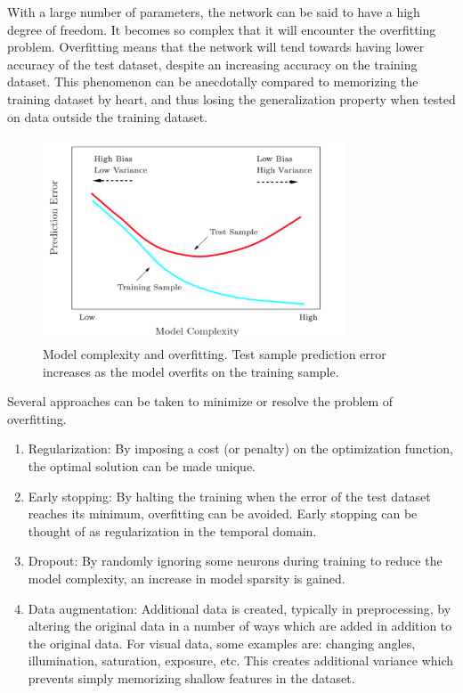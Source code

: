 \documentclass[english, bibtex]{kththesis}
\begin{document}
With a large number of parameters, the network can be said to have a high degree of freedom. It becomes so complex that it will encounter the overfitting problem\cite{doi:10.1021/ci0342472}. Overfitting means that the network will tend towards having lower accuracy of the test dataset, despite an increasing accuracy on the training dataset. This phenomenon can be anecdotally compared to memorizing the training dataset by heart, and thus losing the generalization property when tested on data outside the training dataset. 

\begin{figure}[H]
  \begin{center}
    \includegraphics[width=0.8\textwidth]{figures/overfitting.png}
  \end{center}
  \caption{Model complexity and overfitting\cite{Wang_2019}. Test sample prediction error increases as the model overfits on the training sample.}
  \label{fig:overfitting}
\end{figure}

Several approaches can be taken to minimize or resolve the problem of overfitting.
\begin{enumerate}
\item Regularization\cite{10.1038/317314a0}: By imposing a cost (or penalty) on the optimization function, the optimal solution can be made unique.
\item Early stopping\cite{Prechelt2012}: By halting the training when the error of the test dataset reaches its minimum, overfitting can be avoided. Early stopping can be thought of as regularization in the temporal domain. 
\item Dropout\cite{JMLR:v15:srivastava14a}: By randomly ignoring some neurons during training to reduce the model complexity, an increase in model sparsity is gained. 
\item Data augmentation\cite{10.2307/2289457}: Additional data is created, typically in preprocessing, by altering the original data in a number of ways which are added in addition to the original data. For visual data, some examples are: changing angles, illumination, saturation, exposure, etc. This creates additional variance which prevents simply memorizing shallow features in the dataset.
\end{enumerate}
\end{document}
